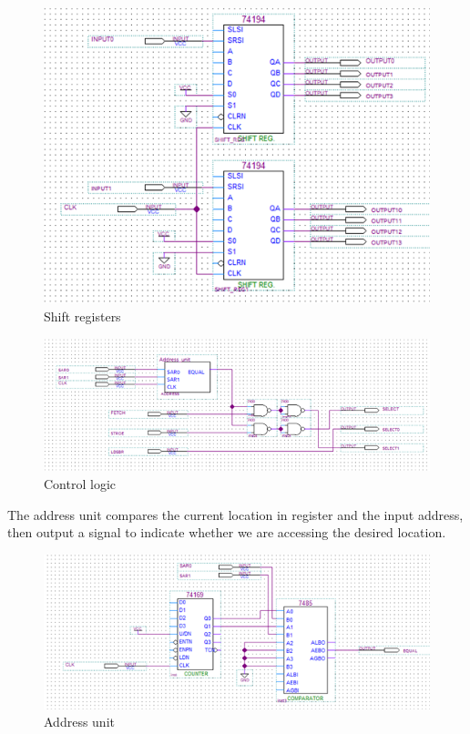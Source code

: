 \documentclass[12pt]{article}
\begin{document}
\begin{figure}[H]
    \centering
    \includegraphics[width=15cm]{shift_register.png}
    \caption{Shift registers}
\end{figure}
\begin{figure}[H]
    \centering
    \includegraphics[width=15cm]{control_logic.png}
    \caption{Control logic}
\end{figure}
The address unit compares the current location in register and the input address, then output a signal to indicate whether we are accessing the desired location. 
\begin{figure}[H]
    \centering
    \includegraphics[width=15cm]{address_unit.png}
    \caption{Address unit}
\end{figure}
\end{document}
